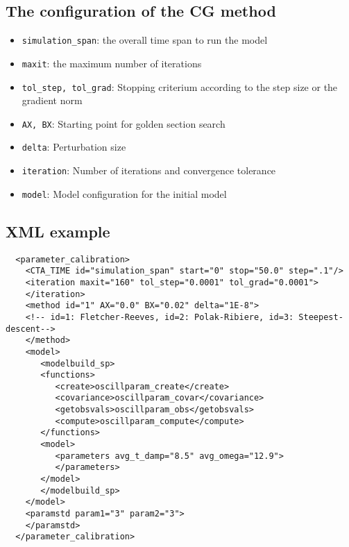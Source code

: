 \subsection{The configuration of the CG method}
\begin{itemize}
\item {\tt simulation\_span}: the overall time span to run the model
\item {\tt maxit}: the maximum number of iterations
\item {\tt tol\_step, tol\_grad}: Stopping criterium  according to the step
  size or the gradient norm
\item {\tt AX, BX}: Starting point for golden section search
\item {\tt delta}: Perturbation size 
\item {\tt iteration}: Number of iterations and convergence tolerance
\item {\tt model}: Model configuration for the initial model
\end{itemize}

\subsection {XML example}
   \begin{verbatim}
  <parameter_calibration>
    <CTA_TIME id="simulation_span" start="0" stop="50.0" step=".1"/>
    <iteration maxit="160" tol_step="0.0001" tol_grad="0.0001">
    </iteration>
    <method id="1" AX="0.0" BX="0.02" delta="1E-8">
    <!-- id=1: Fletcher-Reeves, id=2: Polak-Ribiere, id=3: Steepest-descent-->
    </method>
    <model>
       <modelbuild_sp>
       <functions>
          <create>oscillparam_create</create>
          <covariance>oscillparam_covar</covariance>
          <getobsvals>oscillparam_obs</getobsvals>
          <compute>oscillparam_compute</compute>
       </functions>
       <model>
          <parameters avg_t_damp="8.5" avg_omega="12.9">
          </parameters>
       </model>
       </modelbuild_sp>
    </model>
    <paramstd param1="3" param2="3">
    </paramstd>
  </parameter_calibration>
   \end{verbatim}

